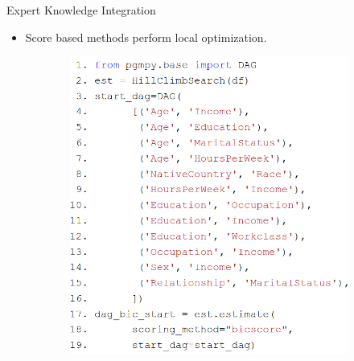 \documentclass{beamer}
\begin{document}
\begin{frame}{Expert Knowledge Integration}
	\begin{itemize}
		\item Score based methods perform local optimization.
	\end{itemize}

	\begin{figure}
		\begin{subfigure}{0.55 \textwidth}
			\centering
			\includegraphics[scale=0.28]{imgs/adult_start.png}
		\end{subfigure}%
		\begin{subfigure}{0.45 \textwidth}
			\centering

\end{subfigure}
\end{figure}
\end{frame}
\end{document}
